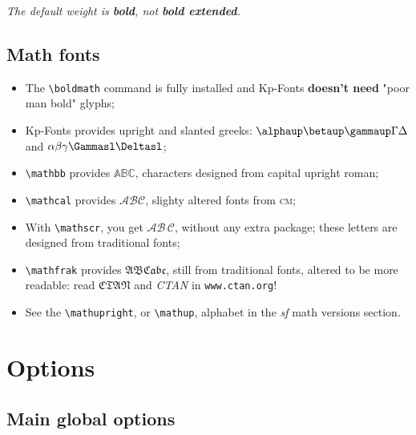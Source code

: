 \documentclass[a4paper,11pt]{christophe}
\begin{document}
\begin{center}\itshape
The default weight is \textbf{bold}, not \textbf{bold extended}.
\end{center}

\subsection{Math fonts}

\begin{itemize}
	\item The \verb+\boldmath+ command is fully installed and Kp-Fonts \textbf{doesn't need} "poor man bold" glyphs;
	\item Kp-Fonts provides upright and slanted greeks: $\alphaup\betaup\gammaup\Gamma\Delta$ and $\alpha\beta\gamma\Gammasl\Deltasl$;
	\item \verb=\mathbb= provides $\mathbb{ABC}$, characters designed from capital upright roman;  
	\item \verb=\mathcal= provides $\mathcal{ABC}$, slighty altered fonts from \textsc{cm};
	\item With \verb=\mathscr=, you get $\mathscr{AB}\,\mathscr{C}$, without any extra package; these letters are designed from traditional fonts;
	\item \verb=\mathfrak= provides $\mathfrak{ABCabc}$, still from traditional fonts, altered to be more readable:
	read $\mathfrak{CTAN}$ and \textit{CTAN} in \texttt{www.ctan.org}!
	\item See the \verb=\mathupright=, or \verb=\mathup=, alphabet in the \textit{sf} math versions section.
\end{itemize}

\section{Options}

\subsection{Main global options}
\end{document}

